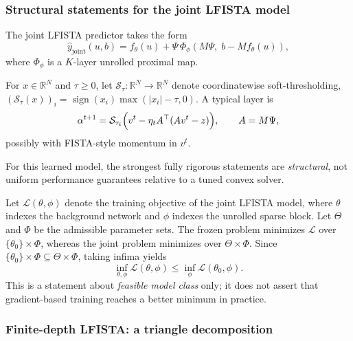 \subsubsection{Structural statements for the joint LFISTA model}

The joint LFISTA predictor takes the form
\begin{equation}
  \widehat{y}_{\mathrm{joint}}(u,b)
  =
  f_\theta(u)
  +
  \Psi\,\Phi_\phi(M\Psi,\; b-Mf_\theta(u)),
  \label{eq:joint_lfista_model}
\end{equation}
where $\Phi_\phi$ is a $K$-layer unrolled proximal map.

For $x\in\mathbb{R}^N$ and $\tau\ge 0$, let $\mathcal{S}_\tau:\mathbb{R}^N\to\mathbb{R}^N$ denote coordinatewise soft-thresholding,
$(\mathcal{S}_\tau(x))_i=\operatorname{sign}(x_i)\max(|x_i|-\tau,0)$.
A typical layer is
\begin{equation}
  \alpha^{t+1}
  =
  \mathcal{S}_{\tau_t}
  \Bigl(
  v^t - \eta_t A^\top(A v^t - z)
  \Bigr),
  \qquad
  A=M\Psi,
  \label{eq:lfista_layer}
\end{equation}
possibly with FISTA-style momentum in $v^t$.

For this learned model, the strongest fully rigorous statements are \emph{structural}, not uniform performance guarantees relative to a tuned convex solver.

\begin{remark}
\label{rem:joint_vs_frozen}
\label{prop:joint_frozen_opt}
Let $\mathcal{L}(\theta,\phi)$ denote the training objective of the joint LFISTA model, where $\theta$ indexes the background network and $\phi$ indexes the unrolled sparse block.
Let $\Theta$ and $\Phi$ be the admissible parameter sets.
The frozen problem minimizes $\mathcal{L}$ over $\{\theta_0\}\times\Phi$, whereas the joint problem minimizes over $\Theta\times\Phi$.
Since $\{\theta_0\}\times\Phi\subseteq\Theta\times\Phi$, taking infima yields
\begin{equation}
  \inf_{\theta,\phi} \mathcal{L}(\theta,\phi)
  \le
  \inf_{\phi} \mathcal{L}(\theta_0,\phi).
  \label{eq:joint_vs_frozen_inf}
\end{equation}
This is a statement about \emph{feasible model class} only; it does not assert that gradient-based training reaches a better minimum in practice.
\end{remark}

\subsubsection{Finite-depth LFISTA: a triangle decomposition}

